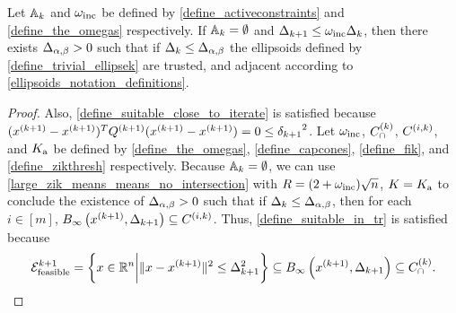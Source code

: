 

\begin{lemma}
\label{ellsoid_is_suitable_theorem_p1}
Let ${\mathbb A_{k}}$ and $\omega_{\text{inc}}$ be defined by \cref{define_activeconstraints} and \cref{define_the_omegas} respectively.
If ${\mathbb A_{k}} = \emptyset$ and $\Delta_{k+1} \le \omega_{\text{inc}}\Delta_k$, 
then there exists ${\Delta_{\alpha,\beta}}>0$ such that if $\Delta_k \le {\Delta_{\alpha,\beta}}$ the
ellipsoids defined by \cref{define_trivial_ellipsek} 
are trusted, and adjacent according to \cref{ellipsoids_notation_definitions}.

\end{lemma}
\begin{proof}
Also, \cref{define_suitable_close_to_iterate} is satisfied because $({{x}^{(k+1)}} - {{x}^{(k+1)}})^T{Q^{(k+1)}}({{x}^{(k+1)}} - {{x}^{(k+1)}}) = 0 \le {\delta_{k+1}}^2$.
Let $\omega_{\text{inc}}$, ${C^{(k)}_{\cap}}$, ${C^{(i, k)}}$, and ${ K_{\textrm{a}} }$ be defined by \cref{define_the_omegas}, \cref{define_capcones}, \cref{define_fik}, and \cref{define_zikthresh} respectively.
Because ${\mathbb A_{k}} = \emptyset$, we can use 
\cref{large_zik_means_means_no_intersection} with $R = (2 + \omega_{\text{inc}})\sqrt{n}$, $K = { K_{\textrm{a}} }$ to conclude the existence of ${\Delta_{\alpha,\beta}} > 0$ such that 
if $\Delta_k \le {\Delta_{\alpha,\beta}}$, then for each 
$i \in [m]$, ${ B_{\infty}\left({{x}^{(k+1)}}, \Delta_{k+1}\right) } \subseteq {C^{(i, k)}}$.
Thus, \cref{define_suitable_in_tr} is satisfied because 
\begin{align*}
{\mathcal E^{k+1}_{\textrm{feasible}}} = \left\{x \in \mathbb R^n \bigg| \|x - {{x}^{(k+1)}}\|^2 \le \Delta_{k+1}^2 \right\} \subseteq { B_{\infty}\left({{x}^{(k+1)}}, \Delta_{k+1}\right) } \subseteq {C^{(k)}_{\cap}}.
\end{align*}
\end{proof}


